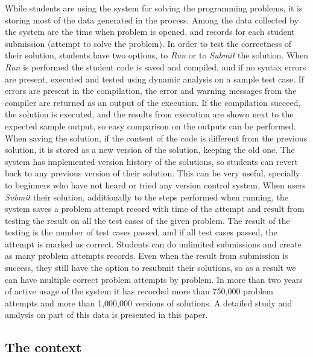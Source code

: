 \documentclass{llncs}
\begin{document}
While students are using the system for solving the programming problems,
it is storing most of the data generated in the process. Among the
data collected by the system are the time when problem is
opened, and records for each student submission (attempt to solve the problem).
In order to test the correctness of their solution, students have two
options, to \emph{Run} or to \emph{Submit} the solution. When \emph{Run} is
performed the student code is saved and compiled, and if no syntax
errors are present, executed and tested using dynamic analysis on a sample test
case.
If errors are present in the compilation, the error and warning messages from the
compiler are returned as an output of the execution. If the compilation
succeed, the solution is executed, and the results from execution are shown next
to the expected sample output, so easy comparison on the outputs can be performed.
When saving the solution, if the content of the code is different from the
previous solution, it is stored as a new version of the solution, keeping the
old one. The system has implemented version history of the solutions, so
students can revert back to any previous version of their solution. This can be
very useful, specially to beginners who have not heard or tried any version
control system.
When users \emph{Submit} their solution, additionally to the steps performed
when running, the system saves a problem attempt record with time of the attempt
and result from testing the result on all the test cases of the given problem. The
result of the testing is the number of test cases passed, and if all test cases
passed, the attempt is marked as correct. Students can do unlimited
submissions and create as many problem attempts records. Even when the result from
submission is success, they still have the option to resubmit their solutions,
so as a result we can have multiple correct problem attempts by problem. In more
than two years of active usage of the system it has recorded more than 750,000
problem attempts and more than 1,000,000 versions of solutions.
A detailed study and analysis on part of this data is presented in this paper.


\subsection{The context}
\end{document}
